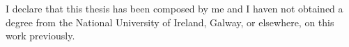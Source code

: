 
\begin{declaration}

I declare that this thesis has been composed by me and I haven not obtained a degree from the National University of Ireland, Galway, or elsewhere, on this work previously.


\end{declaration}

